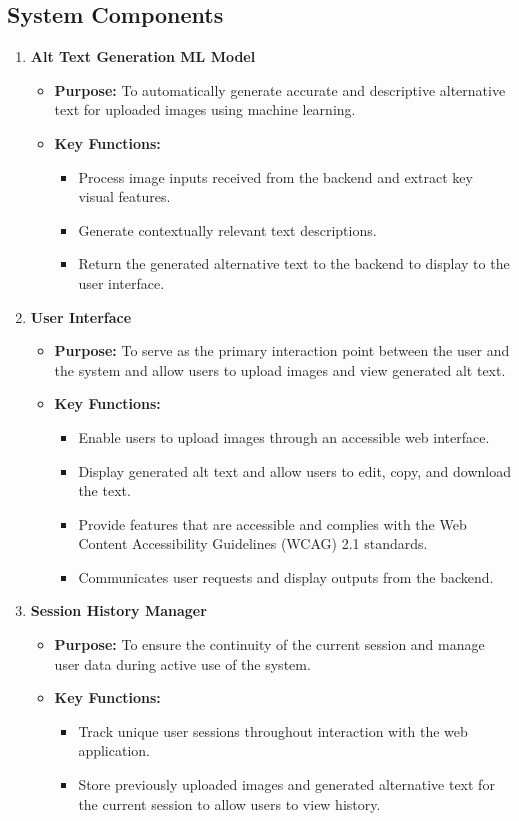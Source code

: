 \documentclass{article}
\begin{document}
\subsection{System Components}
\begin{enumerate}
    \item \textbf{Alt Text Generation ML Model}
    \begin{itemize}
        \item \textbf{Purpose:} To automatically generate accurate and descriptive alternative text for uploaded images using machine learning.
        \item \textbf{Key Functions:}
        \begin{itemize}
            \item Process image inputs received from the backend and extract key visual features.
            \item Generate contextually relevant text descriptions.
            \item Return the generated alternative text to the backend to display to the user interface.
        \end{itemize}
    \end{itemize}
    \item \textbf{User Interface}
    \begin{itemize}
        \item \textbf{Purpose:} To serve as the primary interaction point between the user and the system and allow users to upload images and view generated alt text.
        \item \textbf{Key Functions:}
        \begin{itemize}
            \item Enable users to upload images through an accessible web interface.
            \item Display generated alt text and allow users to edit, copy, and download the text. 
            \item Provide features that are accessible and complies with the Web Content Accessibility Guidelines (WCAG) 2.1 standards.
            \item Communicates user requests and display outputs from the backend.
        \end{itemize}
    \end{itemize}
    \item \textbf{Session History Manager}
    \begin{itemize}
        \item \textbf{Purpose:} To ensure the continuity of the current session and manage user data during active use of the system.
        \item \textbf{Key Functions:}
        \begin{itemize}
            \item Track unique user sessions throughout interaction with the web application.
            \item Store previously uploaded images and generated alternative text for the current session to allow users to view history.
        \end{itemize}
    \end{itemize}
\end{enumerate}
\end{document}
